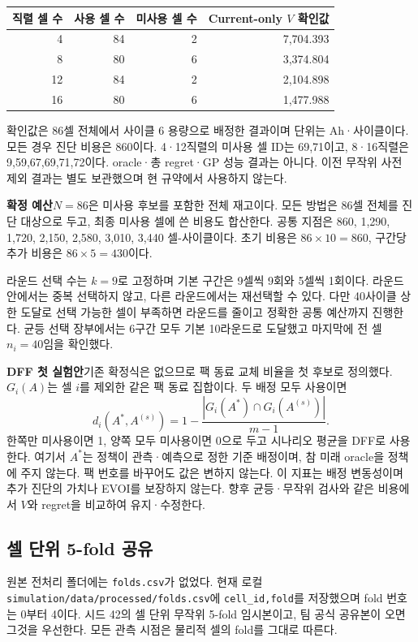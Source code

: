 \documentclass[11pt,a4paper]{article}
\newcommand{\file}[1]{{\small\nolinkurl{#1}}}
\begin{document}
\begin{center}
\begin{tabular}{rrrr}
\toprule
직렬 셀 수 & 사용 셀 수 & 미사용 셀 수 & Current-only $V$ 확인값 \\
\midrule
4  & 84 & 2 & 7,704.393 \\
8  & 80 & 6 & 3,374.804 \\
12 & 84 & 2 & 2,104.898 \\
16 & 80 & 6 & 1,477.988 \\
\bottomrule
\end{tabular}
\end{center}
확인값은 86셀 전체에서 사이클 6 용량으로 배정한 결과이며 단위는 Ah·사이클이다. 모든 경우 진단 비용은 860이다. 4·12직렬의 미사용 셀 ID는 69,71이고, 8·16직렬은 9,59,67,69,71,72이다. oracle·총 regret·GP 성능 결과는 아니다. 이전 무작위 사전 제외 결과는 별도 보관했으며 현 규약에서 사용하지 않는다.

\textbf{확정 예산}\quad $N=86$은 미사용 후보를 포함한 전체 재고이다. 모든 방법은 86셀 전체를 진단 대상으로 두고, 최종 미사용 셀에 쓴 비용도 합산한다. 공통 지점은 860, 1,290, 1,720, 2,150, 2,580, 3,010, 3,440 셀-사이클이다. 초기 비용은 $86\times10=860$, 구간당 추가 비용은 $86\times5=430$이다.

라운드 선택 수는 $k=9$로 고정하며 기본 구간은 9셀씩 9회와 5셀씩 1회이다. 라운드 안에서는 중복 선택하지 않고, 다른 라운드에서는 재선택할 수 있다. 다만 40사이클 상한 도달로 선택 가능한 셀이 부족하면 라운드를 줄이고 정확한 공통 예산까지 진행한다. 균등 선택 장부에서는 6구간 모두 기본 10라운드로 도달했고 마지막에 전 셀 $n_i=40$임을 확인했다.

\textbf{DFF 첫 실험안}\quad 기존 확정식은 없으므로 팩 동료 교체 비율을 첫 후보로 정의했다. $G_i(A)$는 셀 $i$를 제외한 같은 팩 동료 집합이다. 두 배정 모두 사용이면
\[
d_i(A^*,A^{(s)})=1-\frac{|G_i(A^*)\cap G_i(A^{(s)})|}{m-1}.
\]
한쪽만 미사용이면 1, 양쪽 모두 미사용이면 0으로 두고 시나리오 평균을 DFF로 사용한다. 여기서 $A^*$는 정책이 관측·예측으로 정한 기준 배정이며, 참 미래 oracle을 정책에 주지 않는다. 팩 번호를 바꾸어도 값은 변하지 않는다. 이 지표는 배정 변동성이며 추가 진단의 가치나 EVOI를 보장하지 않는다. 향후 균등·무작위 검사와 같은 비용에서 $V$와 regret을 비교하여 유지·수정한다.

\subsection*{셀 단위 5-fold 공유}
원본 전처리 폴더에는 \file{folds.csv}가 없었다. 현재 로컬 \file{simulation/data/processed/folds.csv}에 \file{cell_id,fold}를 저장했으며 fold 번호는 0부터 4이다. 시드 42의 셀 단위 무작위 5-fold 임시본이고, 팀 공식 공유본이 오면 그것을 우선한다. 모든 관측 시점은 물리적 셀의 fold를 그대로 따른다.
\end{document}

